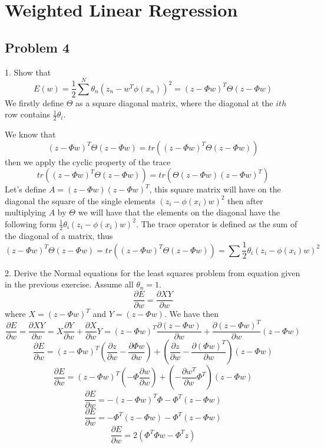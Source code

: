 \section{Weighted Linear Regression}


\subsection*{Problem 4}

1. Show that 
\[
E(w) = \frac{1}{2}\sum^N \theta_n \left( z_n - w^T \phi(x_n) \right)^2 =
( z - \Phi w )^T \Theta (z - \Phi w)
\]
We firstly define $\Theta$ as a square diagonal matrix, where the diagonal 
at the $ith$ row contains $\frac{1}{2}\theta_i$.

We know that 
\[
( z - \Phi w )^T \Theta (z - \Phi w) = tr (( z - \Phi w )^T \Theta (z - \Phi w))
\]
then we apply the cyclic property of the trace 
\[
tr (( z - \Phi w )^T \Theta (z - \Phi w)) = tr ( \Theta (z - \Phi w)( z - \Phi w )^T)
\]
Let's define $A = (z - \Phi w)( z - \Phi w )^T$, this square matrix will have on
the diagonal the square of the single elements $(z_i - \phi(x_i)w)^2$ then after
multiplying $A$ by $\Theta$ we will have that the elements on the diagonal have 
the following form $\frac{1}{2}\theta_i(z_i - \phi(x_i)w)^2$. The trace operator is defined as the
sum of the diagonal of a matrix, thus
\[
( z - \Phi w )^T \Theta (z - \Phi w) = tr ((z - \Phi w)^T \Theta (z - \Phi w))=
\sum\frac{1}{2}\theta_i(z_i - \phi(x_i)w)^2
\]



2. Derive the Normal equations for the least squares problem from equation given
in the previous exercise. Assume
all $\theta_{n}=1$.
\[
\frac{\partial E}{\partial w}=\frac{\partial XY}{\partial w}
\]
where $X=\left(z-\Phi w\right)^{T}$ and $Y=\left(z-\Phi w\right)$.
We have then
\[
\frac{\partial E}{\partial w}=\frac{\partial XY}{\partial w}=X\frac{\partial
Y}{\partial w}+\frac{\partial X}{\partial w}Y=\left(z-\Phi
w\right)^{T}\frac{\partial\left(z-\Phi w\right)}{\partial
w}+\frac{\partial\left(z-\Phi w\right)^{T}}{\partial w}\left(z-\Phi w\right)
\]
\[
\frac{\partial E}{\partial w}=\left(z-\Phi w\right)^{T}\left(\frac{\partial
z}{\partial w}-\frac{\partial\Phi w}{\partial w}\right)+\left(\frac{\partial
z}{\partial w}-\frac{\partial(\Phi w)^{T}}{\partial w}\right)\left(z-\Phi
w\right)
\]
\[
\frac{\partial E}{\partial w}=\left(z-\Phi w\right)^{T}\left(-\Phi\frac{\partial
w}{\partial w}\right)+\left(-\frac{\partial w{}^{T}}{\partial
w}\Phi^{T}\right)\left(z-\Phi w\right)
\]
\[
\frac{\partial E}{\partial w}=-\left(z-\Phi
w\right)^{T}\Phi-\Phi^{T}\left(z-\Phi w\right)
\]
\[
\frac{\partial E}{\partial w}=-\Phi^{T}\left(z-\Phi
w\right)-\Phi^{T}\left(z-\Phi w\right)
\]
\[
\frac{\partial E}{\partial w}=2\left(\Phi^{T}\Phi w-\Phi^{T}z\right)
\]


